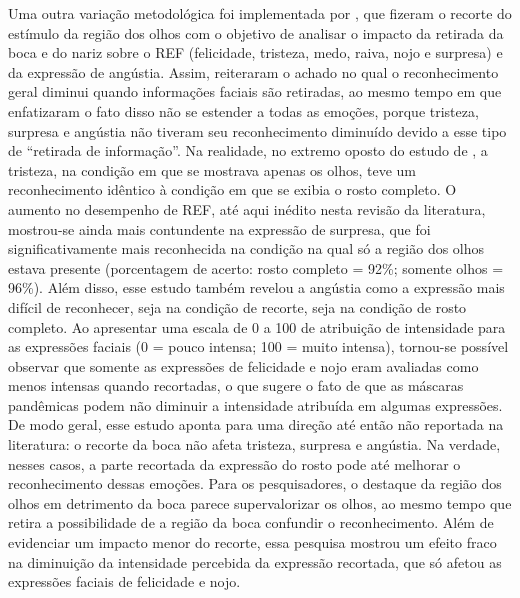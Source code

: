 \documentclass[portuguese]{textolivre}
\begin{document}
Uma outra variação metodológica foi implementada por \textcite{ramachandra_unmasking_2022}, que fizeram o recorte do estímulo da região dos olhos com o objetivo de analisar o impacto da retirada da boca e do nariz sobre o REF (felicidade, tristeza, medo, raiva, nojo e surpresa) e da expressão de angústia. Assim, reiteraram o achado no qual o reconhecimento geral diminui quando informações faciais são retiradas, ao mesmo tempo em que enfatizaram o fato disso não se estender a todas as emoções, porque tristeza, surpresa e angústia não tiveram seu reconhecimento diminuído devido a esse tipo de “retirada de informação”. Na realidade, no extremo oposto do estudo de \textcite{marini_impact_2021}, a tristeza, na condição em que se mostrava apenas os olhos, teve um reconhecimento idêntico à condição em que se exibia o rosto completo. O aumento no desempenho de REF, até aqui inédito nesta revisão da literatura, mostrou-se ainda mais contundente na expressão de surpresa, que foi significativamente mais reconhecida na condição na qual só a região dos olhos estava presente (porcentagem de acerto: rosto completo = 92\%; somente olhos = 96\%). Além disso, esse estudo também revelou a angústia como a expressão mais difícil de reconhecer, seja na condição de recorte, seja na condição de rosto completo. Ao apresentar uma escala de 0 a 100 de atribuição de intensidade para as expressões faciais (0 = pouco intensa; 100 = muito intensa), tornou-se possível observar que somente as expressões de felicidade e nojo eram avaliadas como menos intensas quando recortadas, o que sugere o fato de que as máscaras pandêmicas podem não diminuir a intensidade atribuída em algumas expressões. De modo geral, esse estudo aponta para uma direção até então não reportada na literatura: o recorte da boca não afeta tristeza, surpresa e angústia. Na verdade, nesses casos, a parte recortada da expressão do rosto pode até melhorar o reconhecimento dessas emoções. Para os pesquisadores, o destaque da região dos olhos em detrimento da boca parece supervalorizar os olhos, ao mesmo tempo que retira a possibilidade de a região da boca confundir o reconhecimento. Além de evidenciar um impacto menor do recorte, essa pesquisa mostrou um efeito fraco na diminuição da intensidade percebida da expressão recortada, que só afetou as expressões faciais de felicidade e nojo. 
\end{document}
